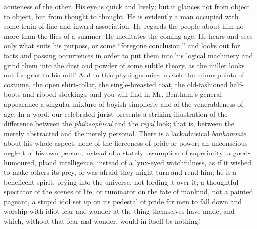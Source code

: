 acuteness of the other. His eye is quick and lively; but it
glances not from object to object, but from thought to thought. He
is evidently a man occupied with some train of fine and inward
association.  He regards the people about him no more than the
flies of a summer. He meditates the coming age. He hears and sees
only what suits his purpose, or some ``foregone conclusion;'' and
looks out for facts and passing occurrences in order to put them
into his logical machinery and grind them into the dust and powder
of some subtle theory, as the miller looks out for grist to his
mill! Add to this physiognomical sketch the minor points of
costume, the open shirt-collar, the single-breasted coat, the
old-fashioned half-boots and ribbed stockings; and you will find
in Mr.  Bentham's general appearance a singular mixture of boyish
simplicity and of the venerableness of age. In a word, our
celebrated jurist presents a striking illustration of the
difference between the \emph{philosophical} and the \emph{regal}
look; that is, between the merely abstracted and the merely
personal. There is a lackadaisical \emph{bonhommie} about his
whole aspect, none of the fierceness of pride or power; an
unconscious neglect of his own person, instead of a stately
assumption of superiority; a good-humoured, placid intelligence,
instead of a lynx-eyed watchfulness, as if it wished to make
others its prey, or was afraid they might turn and rend him; he is
a beneficent spirit, prying into the universe, not lording it over
it; a thoughtful spectator of the scenes of life, or ruminator on
the fate of mankind, not a painted pageant, a stupid idol set up
on its pedestal of pride for men to fall down and worship with
idiot fear and wonder at the thing themselves have made, and
which, without that fear and wonder, would in itself be nothing!

